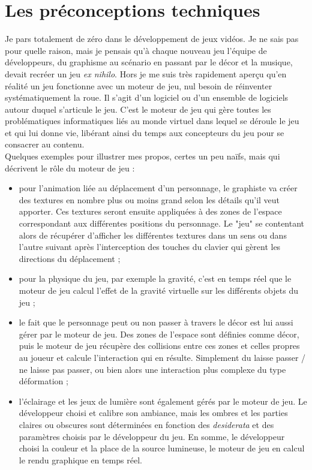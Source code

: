 \documentclass{tstextbook}
\begin{document}
\section{Les préconceptions techniques}
Je pars totalement de zéro dans le développement de jeux vidéos. Je ne sais pas pour quelle raison, mais je pensais qu'à chaque nouveau jeu l'équipe de développeurs, du graphisme au scénario en passant par le décor et la musique, devait recréer un jeu \textit{ex nihilo}. Hors je me suis très rapidement aperçu qu'en réalité un jeu fonctionne avec un moteur de jeu, nul besoin de réinventer systématiquement la roue. Il s'agit d'un logiciel ou d'un ensemble de logiciels autour duquel s'articule le jeu. C'est le moteur de jeu qui gère toutes les problématiques informatiques liés au monde virtuel dans lequel se déroule le jeu et qui lui donne vie, libérant ainsi du temps aux concepteurs du jeu pour se consacrer au contenu. \\
Quelques exemples pour illustrer mes propos, certes un peu naïfs, mais qui décrivent le rôle du moteur de jeu :
\begin{itemize}
\item pour l'animation liée au déplacement d'un personnage, le graphiste va créer des textures en nombre plus ou moins grand selon les détails qu'il veut apporter. Ces textures seront ensuite appliquées à des zones de l'espace correspondant aux différentes positions du personnage. Le "jeu" se contentant alors de récupérer d'afficher les différentes textures dans un sens ou dans l'autre suivant après l'interception des touches du clavier qui gèrent les directions du déplacement ;
\item pour la physique du jeu, par exemple la gravité, c'est en temps réel que le moteur de jeu calcul l'effet de la gravité virtuelle sur les différents objets du jeu ;
\item le fait que le personnage peut ou non passer à travers le décor est lui aussi gérer par le moteur de jeu. Des zones de l'espace sont définies comme décor, puis le moteur de jeu récupère des collisions entre ces zones et celles propres au joueur et calcule l'interaction qui en résulte. Simplement du laisse passer / ne laisse pas passer, ou bien alors une interaction plus complexe du type déformation ;
\item l'éclairage et les jeux de lumière sont également gérés par le moteur de jeu. Le développeur choisi et calibre son ambiance, mais les ombres et les parties claires ou obscures sont déterminées en fonction des \textit{desiderata} et des paramètres choisis par le développeur du jeu. En somme, le développeur choisi la couleur et la place de la source lumineuse, le moteur de jeu en calcul le rendu graphique en temps réel.
\end{itemize}
\end{document}
